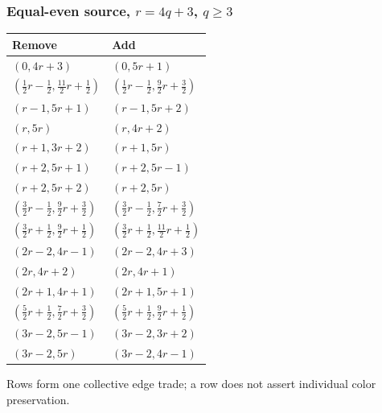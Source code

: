 \subsubsection[Equal-even source, r=4q+3, q >= 3]{Equal-even source, $r=4q+3$, $q\ge3$}
\label{templates:equal-r3}
\begingroup\small
\begin{longtable}{ll}
Remove & Add\\\hline\endhead
$(0,4r+3)$ & $(0,5r+1)$\\
$(\frac{1}{2}r-\frac{1}{2},\frac{11}{2}r+\frac{1}{2})$ & $(\frac{1}{2}r-\frac{1}{2},\frac{9}{2}r+\frac{3}{2})$\\
$(r-1,5r+1)$ & $(r-1,5r+2)$\\
$(r,5r)$ & $(r,4r+2)$\\
$(r+1,3r+2)$ & $(r+1,5r)$\\
$(r+2,5r+1)$ & $(r+2,5r-1)$\\
$(r+2,5r+2)$ & $(r+2,5r)$\\
$(\frac{3}{2}r-\frac{1}{2},\frac{9}{2}r+\frac{3}{2})$ & $(\frac{3}{2}r-\frac{1}{2},\frac{7}{2}r+\frac{3}{2})$\\
$(\frac{3}{2}r+\frac{1}{2},\frac{9}{2}r+\frac{1}{2})$ & $(\frac{3}{2}r+\frac{1}{2},\frac{11}{2}r+\frac{1}{2})$\\
$(2r-2,4r-1)$ & $(2r-2,4r+3)$\\
$(2r,4r+2)$ & $(2r,4r+1)$\\
$(2r+1,4r+1)$ & $(2r+1,5r+1)$\\
$(\frac{5}{2}r+\frac{1}{2},\frac{7}{2}r+\frac{3}{2})$ & $(\frac{5}{2}r+\frac{1}{2},\frac{9}{2}r+\frac{1}{2})$\\
$(3r-2,5r-1)$ & $(3r-2,3r+2)$\\
$(3r-2,5r)$ & $(3r-2,4r-1)$\\
\end{longtable}
Rows form one collective edge trade; a row does not assert individual color preservation.
